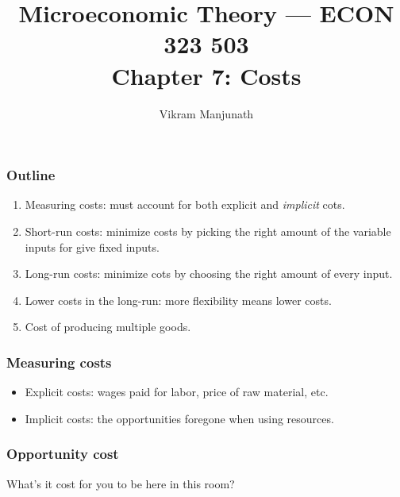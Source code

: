 \documentclass[xcolor=pdftex,dvipsnames]{beamer}
\title{Microeconomic Theory --- ECON 323 503 \\ Chapter 7: Costs}
\author{Vikram Manjunath}
\institute{Texas A\&M University}
\begin{document}
\maketitle

\begin{frame}
\frametitle{Outline}
\begin{enumerate}[<+->]
\item Measuring costs: must account for both explicit and
  \emph{implicit} cots.
\item Short-run costs: minimize costs by picking the right amount of
  the variable inputs for give fixed inputs.
\item Long-run costs: minimize cots by choosing the right amount of
  every input.
\item Lower costs in the long-run: more flexibility means lower costs.
\item Cost of producing multiple goods.
\end{enumerate}
\end{frame}

\begin{frame}
\frametitle{Measuring costs}
\begin{itemize}[<+->]
\item Explicit costs: wages paid for labor, price of raw material,
  etc.
\item Implicit costs: the opportunities  foregone when using resources.
\end{itemize}

\end{frame}



\begin{frame}
\frametitle{Opportunity cost}
What's it cost for you to be here in this room?

\bigskip
{}

\bigskip
{}

\bigskip
{}
\end{frame}
\end{document}
